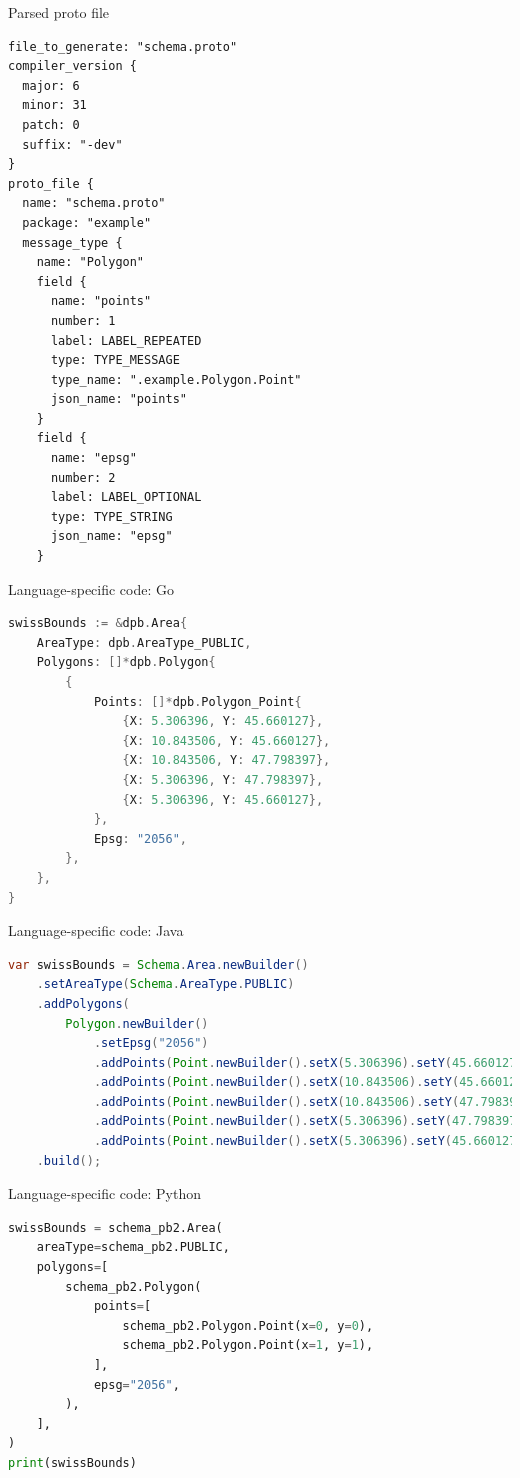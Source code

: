 \documentclass{beamer}
\begin{document}
\begin{frame}[fragile]{Parsed proto file}
\begin{lstlisting}[caption={Parsed protobuf file}]
file_to_generate: "schema.proto"
compiler_version {
  major: 6
  minor: 31
  patch: 0
  suffix: "-dev"
}
proto_file {
  name: "schema.proto"
  package: "example"
  message_type {
    name: "Polygon"
    field {
      name: "points"
      number: 1
      label: LABEL_REPEATED
      type: TYPE_MESSAGE
      type_name: ".example.Polygon.Point"
      json_name: "points"
    }
    field {
      name: "epsg"
      number: 2
      label: LABEL_OPTIONAL
      type: TYPE_STRING
      json_name: "epsg"
    }
\end{lstlisting}
\end{frame}

\begin{frame}[fragile]{Language-specific code: Go}
\begin{lstlisting}[language=go,caption={Create and access proto message in Go}]
swissBounds := &dpb.Area{
    AreaType: dpb.AreaType_PUBLIC,
    Polygons: []*dpb.Polygon{
        {
            Points: []*dpb.Polygon_Point{
                {X: 5.306396, Y: 45.660127},
                {X: 10.843506, Y: 45.660127},
                {X: 10.843506, Y: 47.798397},
                {X: 5.306396, Y: 47.798397},
                {X: 5.306396, Y: 45.660127},
            },
            Epsg: "2056",
        },
    },
}
\end{lstlisting}
\end{frame}

\begin{frame}[fragile]{Language-specific code: Java}
\begin{lstlisting}[language=java,caption={Create and access proto message in Java}]
var swissBounds = Schema.Area.newBuilder()
    .setAreaType(Schema.AreaType.PUBLIC)
    .addPolygons(
        Polygon.newBuilder()
            .setEpsg("2056")
            .addPoints(Point.newBuilder().setX(5.306396).setY(45.660127))
            .addPoints(Point.newBuilder().setX(10.843506).setY(45.660127))
            .addPoints(Point.newBuilder().setX(10.843506).setY(47.798397))
            .addPoints(Point.newBuilder().setX(5.306396).setY(47.798397))
            .addPoints(Point.newBuilder().setX(5.306396).setY(45.660127)))
    .build();
\end{lstlisting}
\end{frame}

\begin{frame}[fragile]{Language-specific code: Python}
\begin{lstlisting}[language=python,caption={Create and access proto message in Python}]
swissBounds = schema_pb2.Area(
    areaType=schema_pb2.PUBLIC,
    polygons=[
        schema_pb2.Polygon(
            points=[
                schema_pb2.Polygon.Point(x=0, y=0),
                schema_pb2.Polygon.Point(x=1, y=1),
            ],
            epsg="2056",
        ),
    ],
)
print(swissBounds)
\end{lstlisting}
\end{frame}
\end{document}
